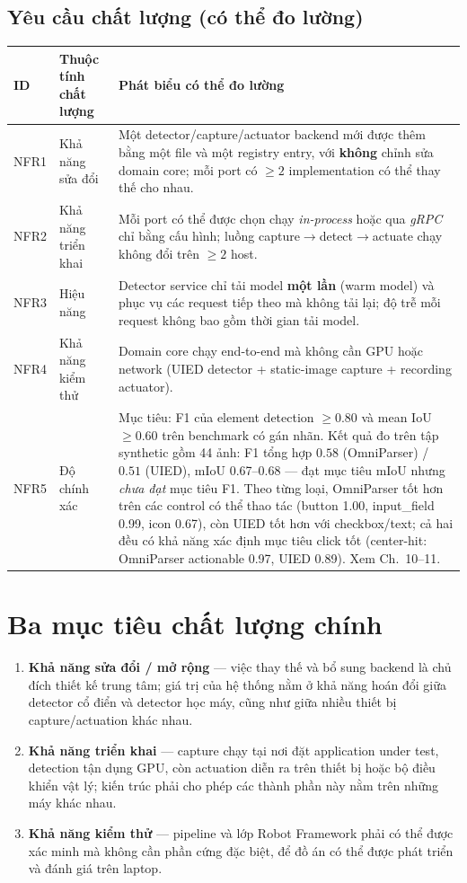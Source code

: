 \documentclass[11pt,a4paper]{report}
\newcommand{\req}[1]{\textbf{#1}}
\begin{document}
\subsection*{Yêu cầu chất lượng (có thể đo lường)}
\begin{longtable}{@{}p{1.6cm}p{4.0cm}p{8.6cm}@{}}
\toprule
\textbf{ID} & \textbf{Thuộc tính chất lượng} & \textbf{Phát biểu có thể đo lường} \\
\midrule
\endhead
NFR1 & Khả năng sửa đổi & Một detector/capture/actuator backend mới được thêm bằng một file và một registry entry, với \textbf{không} chỉnh sửa domain core; mỗi port có $\geq 2$ implementation có thể thay thế cho nhau. \\
NFR2 & Khả năng triển khai & Mỗi port có thể được chọn chạy \emph{in-process} hoặc qua \emph{gRPC} chỉ bằng cấu hình; luồng capture$\rightarrow$detect$\rightarrow$actuate chạy không đổi trên $\geq 2$ host. \\
NFR3 & Hiệu năng & Detector service chỉ tải model \textbf{một lần} (warm model) và phục vụ các request tiếp theo mà không tải lại; độ trễ mỗi request không bao gồm thời gian tải model. \\
NFR4 & Khả năng kiểm thử & Domain core chạy end-to-end mà không cần GPU hoặc network (UIED detector + static-image capture + recording actuator). \\
NFR5 & Độ chính xác & Mục tiêu: F1 của element detection $\geq 0.80$ và mean IoU $\geq 0.60$ trên benchmark có gán nhãn. Kết quả đo trên tập synthetic gồm 44 ảnh: F1 tổng hợp $0.58$ (OmniParser) / $0.51$ (UIED), mIoU 0.67--0.68 --- đạt mục tiêu mIoU nhưng \emph{chưa đạt} mục tiêu F1. Theo từng loại, OmniParser tốt hơn trên các control có thể thao tác (button 1.00, input\_field 0.99, icon 0.67), còn UIED tốt hơn với checkbox/text; cả hai đều có khả năng xác định mục tiêu click tốt (center-hit: OmniParser actionable 0.97, UIED 0.89). Xem Ch.~10--11. \\
\bottomrule
\end{longtable}

\section{Ba mục tiêu chất lượng chính}
\begin{enumerate}[leftmargin=1.6em]
  \item \req{Khả năng sửa đổi / mở rộng} --- việc thay thế và bổ sung backend là chủ đích
        thiết kế trung tâm; giá trị của hệ thống nằm ở khả năng hoán đổi giữa detector cổ điển
        và detector học máy, cũng như giữa nhiều thiết bị capture/actuation khác nhau.
  \item \req{Khả năng triển khai} --- capture chạy tại nơi đặt application under test,
        detection tận dụng GPU, còn actuation diễn ra trên thiết bị hoặc bộ điều khiển vật lý;
        kiến trúc phải cho phép các thành phần này nằm trên những máy khác nhau.
  \item \req{Khả năng kiểm thử} --- pipeline và lớp Robot Framework phải có thể được xác minh
        mà không cần phần cứng đặc biệt, để đồ án có thể được phát triển và đánh giá trên laptop.
\end{enumerate}
\end{document}
